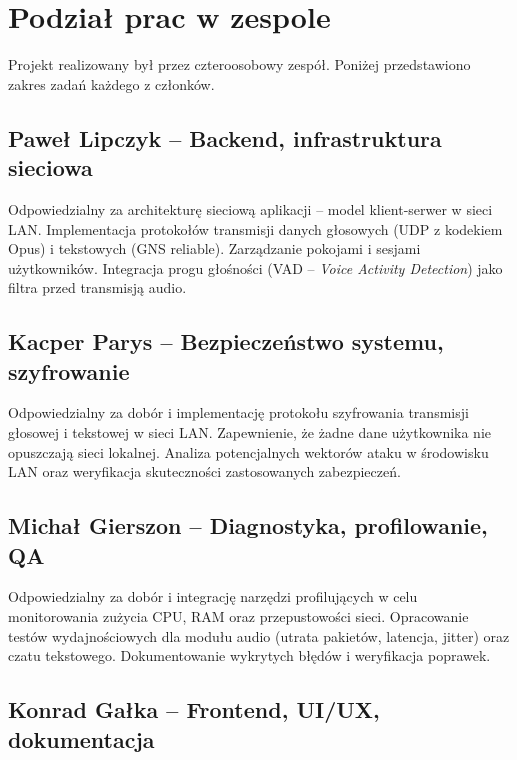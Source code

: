 \section{Podział prac w zespole}
\label{sec:team}

Projekt realizowany był przez czteroosobowy zespół. Poniżej przedstawiono
zakres zadań każdego z członków.

\subsection*{Paweł Lipczyk -- Backend, infrastruktura sieciowa}

Odpowiedzialny za architekturę sieciową aplikacji -- model klient-serwer
w sieci LAN. Implementacja protokołów transmisji danych głosowych (UDP
z kodekiem Opus) i tekstowych (GNS reliable). Zarządzanie pokojami
i sesjami użytkowników. Integracja progu głośności (VAD --
\textit{Voice Activity Detection}) jako filtra przed transmisją audio.

\subsection*{Kacper Parys -- Bezpieczeństwo systemu, szyfrowanie}

Odpowiedzialny za dobór i implementację protokołu szyfrowania transmisji
głosowej i tekstowej w sieci LAN. Zapewnienie, że żadne dane użytkownika
nie opuszczają sieci lokalnej. Analiza potencjalnych wektorów ataku
w środowisku LAN oraz weryfikacja skuteczności zastosowanych zabezpieczeń.

\subsection*{Michał Gierszon -- Diagnostyka, profilowanie, QA}

Odpowiedzialny za dobór i integrację narzędzi profilujących w celu
monitorowania zużycia CPU, RAM oraz przepustowości sieci. Opracowanie
testów wydajnościowych dla modułu audio (utrata pakietów, latencja,
jitter) oraz czatu tekstowego. Dokumentowanie wykrytych błędów
i weryfikacja poprawek.

\subsection*{Konrad Gałka -- Frontend, UI/UX, dokumentacja}

